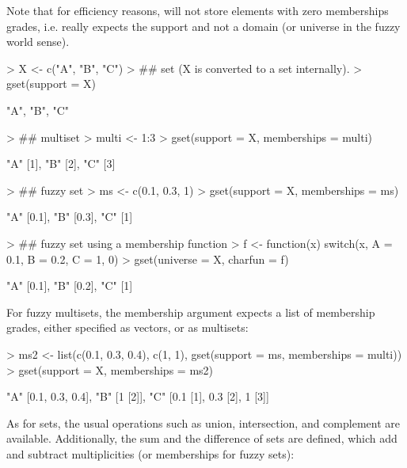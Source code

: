 \documentclass[article]{jss}
\newcommand{\codefun}[1]{\code{#1()}}
\begin{document}
\noindent Note that for efficiency reasons, \codefun{gset} will not
store elements with zero memberships grades, i.e. really expects the
support and not a domain (or universe in the fuzzy world sense).
\begin{Schunk}
\begin{Sinput}
> X <- c("A", "B", "C")
> ## set (X is converted to a set internally).
> gset(support = X)
\end{Sinput}
\begin{Soutput}
{"A", "B", "C"}
\end{Soutput}
\begin{Sinput}
> ## multiset
> multi <- 1:3
> gset(support = X, memberships = multi)
\end{Sinput}
\begin{Soutput}
{"A" [1], "B" [2], "C" [3]}
\end{Soutput}
\begin{Sinput}
> ## fuzzy set
> ms <- c(0.1, 0.3, 1)
> gset(support = X, memberships = ms)
\end{Sinput}
\begin{Soutput}
{"A" [0.1], "B" [0.3], "C" [1]}
\end{Soutput}
\begin{Sinput}
> ## fuzzy set using a membership function
> f <- function(x) switch(x, A = 0.1, B = 0.2, C = 1, 0)
> gset(universe = X, charfun = f)
\end{Sinput}
\begin{Soutput}
{"A" [0.1], "B" [0.2], "C" [1]}
\end{Soutput}
\end{Schunk}
For fuzzy multisets,
the membership argument expects a list of membership grades,
either specified as vectors, or as multisets:
\begin{Schunk}
\begin{Sinput}
> ms2 <- list(c(0.1, 0.3, 0.4), c(1, 1), gset(support = ms, memberships = multi))
> gset(support = X, memberships = ms2)
\end{Sinput}
\begin{Soutput}
{"A" [{0.1, 0.3, 0.4}], "B" [{1 [2]}], "C" [{0.1 [1], 0.3 [2], 1 [3]}]}
\end{Soutput}
\end{Schunk}
As for sets, the usual operations
such as union, intersection, and complement are available.
Additionally, the sum and the difference of sets are defined,
which add and subtract multiplicities (or memberships for fuzzy sets):
\end{document}
